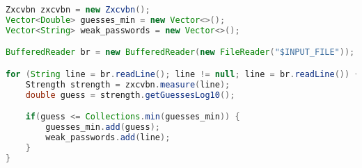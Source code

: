 \begin{lstlisting}[language=java,label=script_test_last, caption=Script pour tester les mots de passe de LastPass]
Zxcvbn zxcvbn = new Zxcvbn();
Vector<Double> guesses_min = new Vector<>();
Vector<String> weak_passwords = new Vector<>();

BufferedReader br = new BufferedReader(new FileReader("$INPUT_FILE"));

for (String line = br.readLine(); line != null; line = br.readLine()) {
	Strength strength = zxcvbn.measure(line);
	double guess = strength.getGuessesLog10();

	if(guess <= Collections.min(guesses_min)) {
		guesses_min.add(guess);
		weak_passwords.add(line);
	}
}
\end{lstlisting}

\begin{table}[H]
\end{table}
